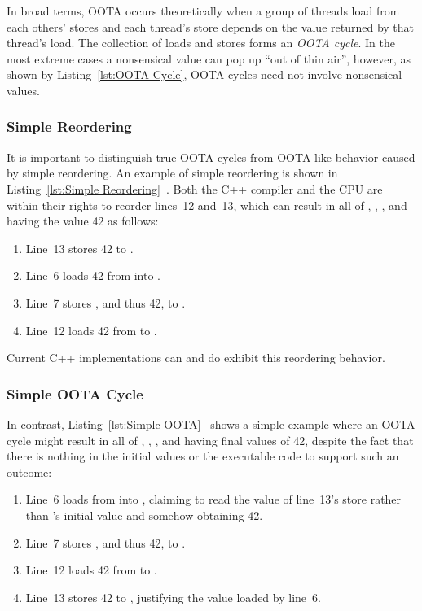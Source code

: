\documentclass[10]{article}
\begin{document}
In broad terms,
OOTA occurs theoretically when a group of threads load from each others' stores
and each thread's store depends on the value returned by that thread's load.
The collection of loads and stores forms an \emph{OOTA cycle}.
In the most extreme cases a nonsensical value can pop up ``out of thin air'',
however, as shown by
Listing~\ref{lst:OOTA Cycle},
OOTA cycles need not involve nonsensical values.

\subsubsection{Simple Reordering}
\label{sec:Simple Reordering}

It is important to distinguish true OOTA cycles from OOTA-like
behavior caused by simple reordering.
An example of simple reordering is shown in
Listing~\ref{lst:Simple Reordering}~\cite{PaulEMcKenney2020RelaxedGuideRelaxed}.
Both the C++ compiler and the CPU are within their rights to reorder
lines~12 and~13, which can result in all of , , ,
and  having the value 42 as follows:
\begin{enumerate}
\item   Line~13 stores 42 to .
\item   Line~6 loads 42 from  into .
\item   Line~7 stores , and thus 42, to .
\item   Line~12 loads 42 from  to .
\end{enumerate}
Current C++ implementations can and do exhibit this reordering behavior.

\subsubsection{Simple OOTA Cycle}
\label{sec:Simple OOTA Cycle}

In contrast,
Listing~\ref{lst:Simple OOTA}~\cite{PaulEMcKenney2020RelaxedGuideRelaxed}
shows a simple example where an OOTA cycle might result in all of ,
, , and  having final values of 42, despite the fact
that there is nothing in the initial values or the executable code to
support such an outcome:

\begin{enumerate}
\item   Line~6 loads from  into , claiming to read
	the value of line~13's store rather than 's initial value
	and somehow obtaining 42.
\item   Line~7 stores , and thus 42, to .
\item   Line~12 loads 42 from  to .
\item   Line~13 stores 42 to , justifying the value loaded by line~6.
\end{enumerate}
\end{document}
